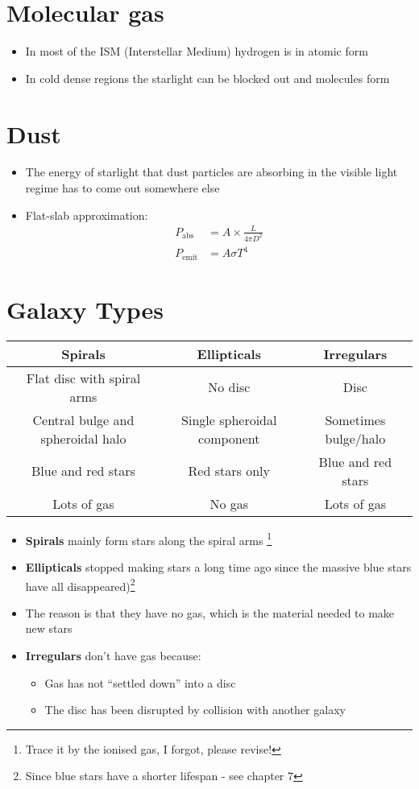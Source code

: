 \documentclass{article}
\begin{document}
\section{Molecular gas}
\begin{itemize}
\item In most of the ISM (Interstellar Medium) hydrogen is in atomic form
\item In cold dense regions the starlight can be blocked out and molecules form
\end{itemize}
\section{Dust}
\begin{itemize}
\item The energy of starlight that dust particles are absorbing
in the visible light regime has to come out somewhere else
\item Flat-slab approximation:
\begin{align}
P_\text{abs}&=A \times \frac{L}{4 \pi D^2}\\
P_\text{emit}&= A \sigma T^4
\end{align}
\end{itemize}
\section{Galaxy Types}
\begin{table}[h!]
  \begin{center}
    \begin{tabular}{c|c|c}
      \textbf{Spirals} & \textbf{Ellipticals} &\textbf{Irregulars}\\
      \hline\hline
      Flat disc with spiral arms & No disc & Disc\\
      Central bulge and spheroidal halo & Single spheroidal component & Sometimes bulge/halo\\
      Blue and red stars & Red stars only & Blue and red stars\\
      Lots of gas & No gas & Lots of gas\\   
    \end{tabular}
  \end{center}
\end{table}
\begin{itemize}
\item \textbf{Spirals} mainly form stars along the spiral arms \footnote{Trace it by the ionised gas, I forgot, please revise!}
\item \textbf{Ellipticals} stopped making stars a long time ago since the massive blue stars have all disappeared)\footnote{Since blue stars have a shorter lifespan - see chapter 7}
\item The reason is that they have no gas, which is the material needed to make new stars
\item \textbf{Irregulars} don't have gas because:
\begin{itemize}
\item Gas has not “settled down” into a disc
\item The disc has been disrupted by collision with another galaxy
\end{itemize}
\end{itemize}
\end{document}
